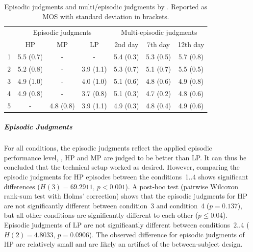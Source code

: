 \begin{table}[b]
	\centering
	\caption[\citet{moller_single-call_2011}: episodic judgments and multi\-/episodic judgments]{Episodic judgments and multi\-/episodic judgments by \citet{moller_single-call_2011}. Reported as \ac{MOS} with standard deviation in brackets.}
	\label{tab:state:MOLLERepisodic}
	\begin{tabular}{c||c|c|c||c|c|c}
	\multirow{2}{*}{\rotatebox{90}{Cond.}} & \multicolumn{3}{c||}{Episodic judgments} &  \multicolumn{3}{c}{Multi-episodic judgments} \\
	  & \ac{HP}	& \ac{MP} & \ac{LP} & 2nd	day & 7th day & 12th day \\
	\midrule
	1 			& 5.5 (0.7) & - & - & 5.4 (0.3) & 5.3 (0.5) & 5.7 (0.8) \\
	\hline
	2 			& 5.2 (0.8) & - & 3.9 (1.1) & 5.3 (0.7) & 5.1 (0.7) & 5.5 (0.5) \\
	\hline
	3 			& 4.9 (1.0) & - & 4.0 (1.0) & 5.1 (0.6) & 4.8 (0.6) & 4.9 (0.8) \\
	\hline
	4 			& 4.9 (0.8) & - & 3.7 (0.8) & 5.1 (0.3) & 4.7 (0.2) & 4.8 (0.6) \\
	\hline
	5 			& -	& 4.8 (0.8) & 3.9 (1.1) & 4.9 (0.3) & 4.8 (0.4) & 4.9 (0.6) \\
	\end{tabular}
\end{table}

\subparagraph*{Episodic Judgments}
For all conditions, the episodic judgments reflect the applied episodic performance level, \ie, \ac{HP} and \ac{MP} are judged to be better than \ac{LP}.
It can thus be concluded that the technical setup worked as desired.
However, comparing the episodic judgments for \ac{HP} episodes between the conditions~1..4 shows significant differences ($H(3)=69.2911$, $p<0.001$).
A post-hoc test (pairwise Wilcoxon rank-sum test with Holms' correction) shows that the episodic judgments for \ac{HP} are not significantly different between condition~3 and condition~4 ($p=0.137$), but all other conditions are significantly different to each other ($p\leq0.04$). %
Episodic judgments of \ac{LP} are not significantly different between conditions~2..4 ($H(2)=4.8033$, $p=0.0906$).
The observed difference for episodic judgments of \ac{HP} are relatively small and are likely an artifact of the between-subject design.

